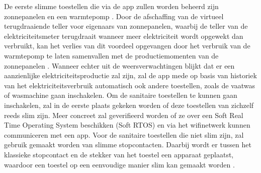 De eerste slimme toestellen die via de app zullen worden beheerd zijn zonnepanelen en een warmtepomp \autocite{Uytterhoeven2019}. Door de afschaffing van de virtueel terugdraaiende teller voor eigenaars van zonnepanelen, waarbij de teller van de elektriciteitsmeter terugdraait wanneer meer elektriciteit wordt opgewekt dan verbruikt, kan het verlies van dit voordeel opgevangen door het verbruik van de warmtepomp te laten samenvallen met de productiemomenten van de zonnepanelen \autocite{Selleslagh2021}. Wanneer echter uit de weersverwachtingen blijkt dat er een aanzienlijke elektriciteitsproductie zal zijn, zal de app  mede op basis van historiek van het elektriciteitsverbruik automatisch ook andere toestellen, zoals de vaatwas of wasmachine gaan inschakelen. Om de sanitaire toestellen te kunnen gaan inschakelen, zal in de eerste plaats gekeken worden of deze toestellen van zichzelf reeds slim zijn. Meer concreet zal geverifieerd worden of ze over een Soft Real Time Operating System beschikken (Soft RTOS) en via het wifinetwerk kunnen communiceren met een app. Voor de sanitaire toestellen die niet slim zijn, zal gebruik gemaakt worden van slimme stopcontacten. Daarbij wordt er tussen het klassieke stopcontact en de stekker van het toestel een apparaat geplaatst, waardoor een toestel op een eenvoudige manier slim kan gemaakt worden \autocite{Jong2020}.

